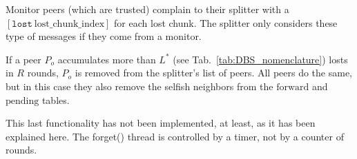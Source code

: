 
\label{sec:free_riding_control}

Monitor peers (which are trusted) complain to their splitter with a
$[\mathtt{lost}~\text{lost\_chunk\_index}]$ for each lost chunk. The
splitter only considers these type of messages if they come from a
monitor.

If a peer $P_o$ accumulates more than $L^*$ (see
Tab.~\ref{tab:DBS_nomenclature}) losts in $R$ rounds, $P_o$ is removed
from the splitter's list of peers. All peers do the same, but in this
case they also remove the selfish neighbors from the $\text{forward}$
and $\text{pending}$ tables.


\begin{notex}
This last functionality has not been implemented, at least, as it has
been explained here. The forget() thread is controlled by a timer, not
by a counter of rounds.
\end{notex}

